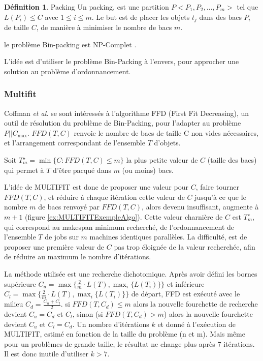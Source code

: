 \documentclass[a4paper,12pt]{report}
\theoremstyle{plain}				%
\theoremstyle{definition}				%
\newtheorem{definition}{Définition} %
\newcommand\problemGrahamP{$P||C_{\max}$\xspace}
\newcommand{\tdi}[1]{\todo[inline]{{#1}}{}}
\newcommand{\lp}[1]{\todo[author=LP,color=yellow,inline]{#1}}
\begin{document}
\begin{definition}{Packing}
  Un packing, est une partition $P<P_1, P_2, ..., P_m>$ tel que
  $L(P_i) \leq C$ avec $1 \leq i\leq m$.
  Le but est de placer les objets $t_j$ dans des bacs $P_i$ de taille
  $C$, de manière à minimiser le nombre de bacs $m$.
\end{definition}

le problème Bin-packing est NP-Complet \cite{Johnson1974WorstCasePB}.

L'idée est d'utiliser le problème Bin-Packing à l'envers, pour
approcher une solution au problème d'ordonnancement.


\subsubsection{Multifit}

Coffman \emph{et al.} \cite{coffman1978application} se sont
intéressés à l'algorithme FFD (First Fit Decreasing), un outil de
résolution du problème de Bin-Packing, pour l'adapter au problème
\problemGrahamP.
$FFD(T,C)$ renvoie le nombre de bacs de taille C non vides
nécessaires, et l'arrangement correspondant de l'ensemble $T$ d'objets.

\bigskip
Soit $T_m^\star = \min\{C:FFD(T,C) \leq m\}$ la plus petite valeur de
$C$ (taille des bacs) qui permet à $T$ d'être pacqué dans $m$ (ou moins)
bacs.

\bigskip


L'idée de MULTIFIT est donc de proposer une valeur pour $C$, faire
tourner $FFD(T,C) $, et réduire à chaque itération cette valeur de $C$
jusqu'à ce que le nombre $m$ de bacs renvoyé par $FFD(T,C) $, alors
devenu insuffisant, augmente à $m+1$ (figure \ref{ex:MULTIFITExempleAlgo}).
Cette valeur charnière de $C$ est $T_m^\star$, qui correspond au
makespan minimum recherché, de l'ordonnancement de l'ensemble $T$ de
jobs sur $m$ machines identiques parallèles.
La difficulté, est de proposer une première valeur de $C$ pas trop
éloignée de la valeur recherchée, afin de réduire au maximum le nombre
d'itérations.

La méthode utilisée est une recherche dichotomique.
Après avoir défini les bornes supérieure
$C_u = \max\{\frac{2}{m} \cdot L(T), \max_i\{L(T_i)\} \}$ et
inférieure $C_l = \max\{\frac{2}{m} \cdot L(T), \max_i\{L(T_i)\} \}$
de départ, FFD est exécuté avec le milieu $C_d = \frac{C_u + C_l}{2}$.
si $FFD(T,C_d)\le m$ alors la nouvelle fourchette de recherche devient
$C_u = C_d$ et $C_l$, sinon (si $FFD(T,C_d)> m$) alors la nouvelle
fourchette devient $C_u$ et $C_l = C_d$.
Un nombre d'itérations $k$ et donné à l'exécution de MULTIFIT, estimé
en fonction de la taille du problème (n et m).
Mais même pour un problèmes de grande taille, le résultat ne change
plus après $7$ itérations.
Il est donc inutile d'utiliser $k>7$.
\end{document}
